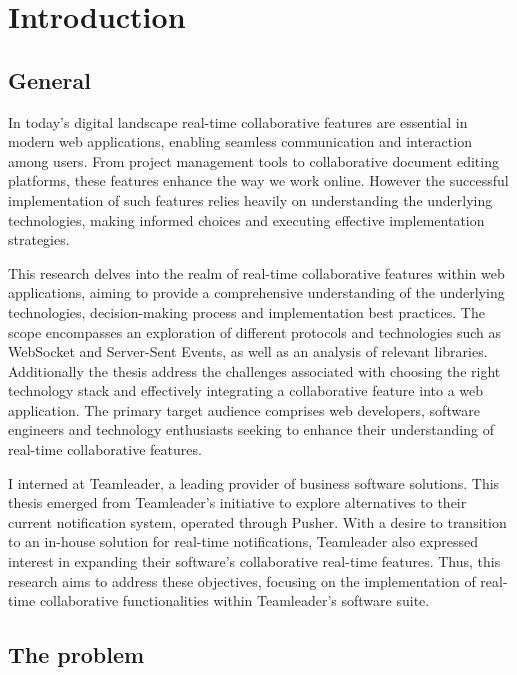 \newpage

\section{Introduction}

\subsection{General}

In today's digital landscape real-time collaborative features are essential in modern web applications, enabling seamless communication and interaction among users. From project management tools to collaborative document editing platforms, these features enhance the way we work online. However the successful implementation of such features relies heavily on understanding the underlying technologies, making informed choices and executing effective implementation strategies.

This research delves into the realm of real-time collaborative features within web applications, aiming to provide a comprehensive understanding of the underlying technologies, decision-making process and implementation best practices. The scope encompasses an exploration of different protocols and technologies such as WebSocket and Server-Sent Events, as well as an analysis of relevant libraries. Additionally the thesis address the challenges associated with choosing the right technology stack and effectively integrating a collaborative feature into a web application. The primary target audience comprises web developers, software engineers and technology enthusiasts seeking to enhance their understanding of real-time collaborative features.

I interned at Teamleader, a leading provider of business software solutions. This thesis emerged from Teamleader's initiative to explore alternatives to their current notification system, operated through Pusher. With a desire to transition to an in-house solution for real-time notifications, Teamleader also expressed interest in expanding their software's collaborative real-time features. Thus, this research aims to address these objectives, focusing on the implementation of real-time collaborative functionalities within Teamleader's software suite.

\subsection{The problem}


